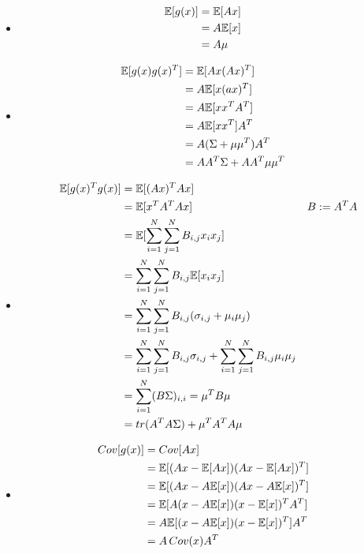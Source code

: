 %
%
\begin{itemize}
  \item 
    \begin{align*}
    \mathbb{E}[g(x)] &= \mathbb{E}[Ax] &\\
    &= A\mathbb{E}[x] &\\
    &= A\mu &
  \end{align*}
  \item 
    \begin{align*}
      \mathbb{E}[g(x)g(x)^T] &= \mathbb{E}[Ax(Ax)^T] &\\
      &= A \mathbb{E}[x(ax)^T] &\\
      &= A \mathbb{E}[xx^TA^T] &\\
      &= A \mathbb{E}[xx^T] A^T &\\
      &= A(\Sigma + \mu\mu^T)A^T &\\
      &= A A^T \Sigma + AA^T\mu\mu^T&
    \end{align*}
  \item 
    \begin{align*}
      \mathbb{E}[g(x)^Tg(x)] &= \mathbb{E}[(Ax)^TAx] &\\
      &= \mathbb{E}[x^TA^TAx] & B := A^TA \\
      &= \mathbb{E}[\sum_{i=1}^N \sum_{j=1}^N B_{i,j} x_i x_j ] & \\
      &= \sum_{i=1}^N \sum_{j=1}^N B_{i,j} \mathbb{E}[x_ix_j] &\\
      &= \sum_{i=1}^N \sum_{j=1}^N B_{i,j} (\sigma_{i,j} + \mu_i \mu_j) &\\
      &= \sum_{i=1}^N \sum_{j=1}^N B_{i,j} \sigma_{i,j} + \sum_{i=1}^N \sum_{j=1}^N B_{i,j} \mu_i \mu_j &\\
      &= \sum_{i=1}^N (B\Sigma)_{i,i} = \mu^T B \mu &\\
      &= tr(A^TA\Sigma) + \mu^TA^TA\mu &
    \end{align*}
  \item 
    \begin{align*}
      Cov[g(x)] &= Cov[Ax] &\\
      &= \mathbb{E}[(Ax - \mathbb{E}[Ax])(Ax - \mathbb{E}[Ax])^T] &\\
      &= \mathbb{E}[(Ax - A\mathbb{E}[x])(Ax - A\mathbb{E}[x])^T] &\\
      &= \mathbb{E}[A(x - A\mathbb{E}[x])(x - \mathbb{E}[x])^TA^T] &\\
      &= A\mathbb{E}[(x - A\mathbb{E}[x])(x - \mathbb{E}[x])^T]A^T &\\
      &= A \, Cov(x) A^T &
    \end{align*}
\end{itemize}
%
%



